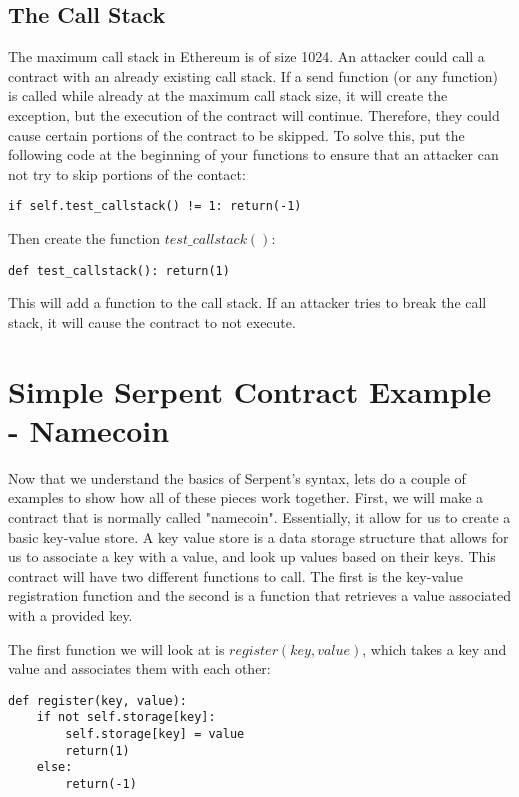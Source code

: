 \documentclass[12pt]{article}
\begin{document}
\subsection{The Call Stack}

The maximum call stack in Ethereum is of size 1024. An attacker could call a contract with an already existing call stack. If a send function (or any function) is called while already at the maximum call stack size, it will create the exception, but the execution of the contract will continue. Therefore, they could cause certain portions of the contract to be skipped. To solve this, put the following code at the beginning of your functions to ensure that an attacker can not try to skip portions of the contact:

\begin{verbatim}
if self.test_callstack() != 1: return(-1)
\end{verbatim} 

Then create the function $test\_callstack()$:

\begin{verbatim}
def test_callstack(): return(1)
\end{verbatim}

This will add a function to the call stack. If an attacker tries to break the call stack, it will cause the contract to not execute.

\section{Simple Serpent Contract Example - Namecoin}
Now that we understand the basics of Serpent's syntax, lets do a couple of examples to show how all of these pieces work together. First, we will make a contract that is normally called "namecoin". Essentially, it allow for us to create a basic key-value store. A key value store is a data storage structure that allows for us to associate a key with a value, and look up values based on their keys. This contract will have two different functions to call. The first is the key-value registration function and the second is a function that retrieves a value associated with a provided key.

The first function we will look at is $register(key, value)$, which takes a key and value and associates them with each other:

\begin{verbatim}
def register(key, value):
	if not self.storage[key]:
		self.storage[key] = value
		return(1)
	else:
		return(-1)
\end{verbatim}
\end{document}
